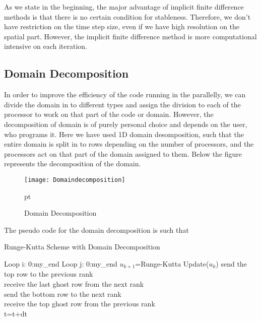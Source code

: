\documentclass[10pt,a4paper]{report}
\begin{document}
As we state in the beginning, the major advantage of implicit finite difference methods is that there is no certain condition for stableness. Therefore, we don't have restriction on the time step size, even if we have high resolution on the spatial part. However, the implicit finite difference method is more computational intensive on each iteration.





\subsection{Domain Decomposition}

In order to improve the efficiency of the code running in the parallelly, we can divide the domain in to different types and assign the division to each of the processor to work on that part of the code or domain. However, the decomposition of domain is of purely personal choice and depends on the user, who programs it. Here we have used 1D domain desomposition, such that the entire domain is split in to rows depending on the number of processors, and the processors act on that part of the domain assigned to them. Below the figure represents the decomposition of the domain.
\pagebreak
\begin{figure}[h]
\begin{center}
\texttt{[image: Domaindecomposition]} 
\caption{Domain Decomposition}  pt
\label{fig:domain}
\end{center}
\end{figure}


The pseudo code for the domain decomposition is such that
\begin{algorithm}[h]
\caption{Runge-Kutta Scheme with Domain Decomposition}
  \KwIn{}
  \KwOut{}
  
  {

	Loop i: 0:my\_end\;	
    \Indp Loop j: 0:my\_end\;
      	\Indp $u_{k+1}$=Runge-Kutta Update($u_{k}$)\;
    \bigskip 
    \Indm \Indm send the top row to the previous rank\\
	receive the last ghost row from the next rank\\
	\bigskip 		
	send the bottom row to the next rank\\
	receive the top ghost row from the previous rank\\   
	\bigskip
    t=t+dt
  }

\end{algorithm}
\end{document}
